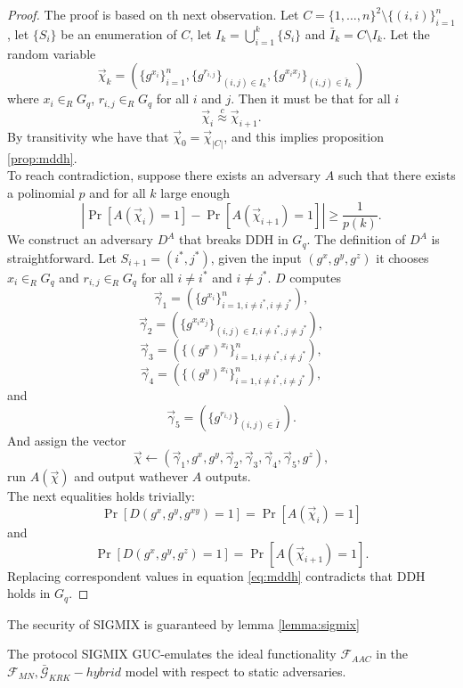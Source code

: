 \documentclass{acm_proc_article-sp}
\begin{document}
\begin{proof}
The proof is based on th next observation. Let 
$C = \{1, \dots, n\}^2 \setminus \{(i,i)\}_{i=1}^n$, let $\{S_i\}$ be an enumeration of $C$,
let $I_k = \bigcup_{i=1}^k\{S_i\}$ and $\bar{I}_k = C \setminus I_k$. Let the random variable
$$
\vec{\chi}_k=
(\{g^{x_i}\}_{i=1}^n,
 \{g^{r_{i,j}}\}_
 {
    (i,j) \in I_k
 },
 \{g^{x_ix_j}\}_
 {
    (i,j)\in \bar{I}_k\
 })
$$
where $x_i\in_R G_q$, $r_{i,j} \in_R G_q$ for all $i$ and $j$.
Then it must be that for all $i$
$$
\vec{\chi}_i \overset{c}{\approx} \vec{\chi}_{i+1}.
$$
By transitivity whe have that $\vec{\chi}_0 = \vec{\chi}_{|C|}$, and this implies proposition \ref{prop:mddh}.\\
To reach contradiction, suppose there exists an adversary $A$ such that there exists a polinomial $p$ and
for all $k$ large enough
\begin{equation}
\left| \Pr[A(\vec{\chi}_i)=1]-\Pr[A(\vec{\chi}_{i+1})=1] \right| \geq \frac{1}{p(k)}.
\label{eq:mddh}
\end{equation}
We construct an adversary $D^A$ that breaks DDH in $G_q$. The definition of $D^A$ is straightforward.
Let $S_{i+1} = (i^*, j^*)$,
given the input $(g^x, g^y, g^z)$ it
chooses $x_i \in_R G_q$ and $r_{i,j} \in_R G_q$  for all $i \neq i^*$ and $i \neq j^*$. $D$ computes
$$
\vec{\gamma}_1 =
(\{g^{x_i}\}_{i=1, i\neq i^*, i \neq j^*}^n),
$$
$$
\vec{\gamma}_2 =
(\{g^{x_ix_j}\}_
 {
    (i,j) \in I,
     i \neq i^*,
     j \neq j^*
 }),
$$
$$
\vec{\gamma}_3 =
(\{(g^x)^{x_i}\}_{i=1, i\neq i^*, i \neq j^*}^n),
$$
$$
\vec{\gamma}_4=
(\{(g^y)^{x_i}\}_{i=1, i\neq i^*, i \neq j^*}^n),
$$
and
$$
\vec{\gamma}_5=
(\{g^{r_{i,j}}\}_
 {
    (i,j)\in \bar{I}\
 }).
$$
And assign the vector 
$$
\vec{\chi} \leftarrow  
(
    \vec{\gamma}_1,
    g^x,
    g^y, 
    \vec{\gamma}_2,
    \vec{\gamma}_3,
    \vec{\gamma}_4,
    \vec{\gamma}_5,
    g^z
),
$$
run $A(\vec{\chi})$ and output wathever $A$ outputs.\\
The next equalities holds trivially:
$$
\Pr[D(g^x,g^y,g^{xy})=1] = \Pr[A(\vec{\chi}_i)=1]
$$
and
$$
\Pr[D(g^x,g^y,g^z)=1] = \Pr[A(\vec{\chi}_{i+1})=1].
$$
Replacing correspondent values in equation \ref{eq:mddh} contradicts that DDH holds in $G_q$.
\end{proof}

The security of SIGMIX is guaranteed by lemma \ref{lemma:sigmix}

\begin{lemma} 
The protocol SIGMIX GUC-emulates the ideal functionality $\mathcal{F}_{AAC}$ in the
$\mathcal{F}_{MN}, \bar{\mathcal{G}}_{KRK}-hybrid$ model with respect to static adversaries.
\label{lemma:sigmix}
\end{lemma}
\end{document}
